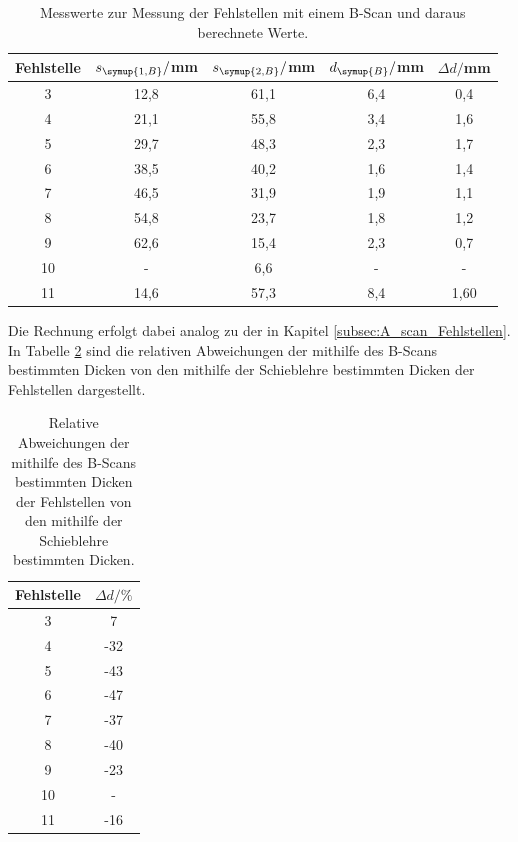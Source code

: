 \begin{table}[htp]
	\begin{center}
    \caption{Messwerte zur Messung der Fehlstellen mit einem B-Scan und daraus berechnete Werte.}
    \label{tab:b-scan}
		\begin{tabular}{ccccc}
		\toprule
			{Fehlstelle} & {$s_{\symup{1,B}}/$mm} & {$s_{\symup{2,B}}/$mm} & {$d_{\symup{B}}/$mm} & {$\Delta d/$mm}\\
			\midrule
			3 & 12,8 & 61,1 & 6,4 & 0,4\\
			4 & 21,1 & 55,8 & 3,4 & 1,6\\
			5 & 29,7 & 48,3 & 2,3 & 1,7\\
			6 & 38,5 & 40,2 & 1,6 & 1,4\\
			7 & 46,5 & 31,9 & 1,9 & 1,1\\
			8 & 54,8 & 23,7 & 1,8 & 1,2\\
			9 & 62,6 & 15,4 & 2,3 & 0,7\\
			10 & {-} & 6,6 & {-} & {-} \\
		11 & 14,6 & 57,3 & 8,4 & 1,60\\
		\bottomrule
		\end{tabular}
	\end{center}
\end{table}

Die Rechnung erfolgt dabei analog zu der in Kapitel \ref{subsec:A_scan_Fehlstellen}.
In Tabelle \ref{tab:abweichungb} sind die relativen Abweichungen der mithilfe des B-Scans
bestimmten Dicken von den mithilfe der Schieblehre bestimmten Dicken der Fehlstellen
dargestellt.

\begin{table}[htp]
	\begin{center}
		\caption{Relative Abweichungen der mithilfe des B-Scans bestimmten Dicken der Fehlstellen
		von den mithilfe der Schieblehre bestimmten Dicken.}
		\label{tab:abweichungb}
		\begin{tabular}{cc}
		\toprule
			{Fehlstelle} & {$\Delta d/\%$}\\
			\midrule
			3 & 7\\
			4 & -32\\
			5 & -43\\
			6 & -47\\
			7 & -37\\
			8 & -40\\
			9 & -23\\
			10 & {-}\\
			11 & -16\\
		\bottomrule
		\end{tabular}
	\end{center}
\end{table}

